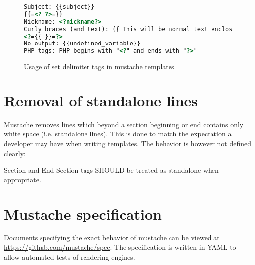 \documentclass[thesis.tex]{subfiles}
\begin{document}
\begin{figure}
	\centering
	\begin{lstlisting}[language=HTML]
Subject: {{subject}}
{{=<? ?>=}}
Nickname: <?nickname?>
Curly braces (and text): {{ This will be normal text enclosed by curly braces }}
<?={{ }}=?>
No output: {{undefined_variable}}
PHP tags: PHP begins with "<?" and ends with "?>"
	\end{lstlisting}
	\caption{Usage of set delimiter tags in mustache templates}
	\label{fig:set-delim.mustache}
\end{figure}

\section{Removal of standalone lines}
\label{app:mustache-standalone-lines}
Mustache removes lines which beyond a section beginning or end contains
only white space (i.e. standalone lines).
This is done to match the expectation a developer may have when writing
templates.
The behavior is however not defined clearly:
\begin{citequote}{\cite[sections.yml]{MSTSPEC}}
	Section and End Section tags SHOULD be treated as standalone when
	appropriate. 
\end{citequote}

\section{Mustache specification}
\label{app:mustache-specification}
Documents specifying the exact behavior of mustache can be viewed at
\url{https://github.com/mustache/spec}. The specification is written in YAML to
allow automated tests of rendering engines.
\end{document}

